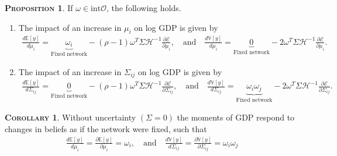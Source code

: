 \documentclass[11pt]{article}
\theoremstyle{definition}
\newtheorem{prop}{\noindent \textbf{\textsc{Proposition}}}
\newtheorem{cor}{\noindent \textbf{\textsc{Corollary}}}
\begin{document}
	\begin{prop}
		If $\omega\in\text{int}\mathcal{O}$, the following holds.
		\begin{enumerate}[leftmargin=1cm, label=\arabic*.]
			\item The impact of an increase in $\mu_i$ on log GDP is given by
			\begin{align*}
				\frac{d\mathbb{E}[y]}{d\mu_i} = \underbrace{\omega_i}\limits_{\text{Fixed network}} - (\rho-1)\omega^T\Sigma\mathcal{H}^{-1}\frac{\partial\mathcal{E}}{\partial\mu_i}, \quad \text{and}\quad \frac{d\mathbb{V}[y]}{d\mu_i} = \underbrace{0}\limits_{\text{Fixed network}} - 2\omega^T\Sigma\mathcal{H}^{-1}\frac{\partial\mathcal{E}}{\partial\mu_i}. 
			\end{align*}
			\item The impact of an increase in $\Sigma_{ij}$ on log GDP is given by
			\begin{align*}
				\frac{d\mathbb{E}[y]}{d\Sigma_{ij}} = \underbrace{0}\limits_{\text{Fixed network}} - (\rho-1)\omega^T\Sigma\mathcal{H}^{-1}\frac{\partial\mathcal{E}}{\partial\Sigma_{ij}}, \quad \text{and}\quad \frac{d\mathbb{V}[y]}{d\Sigma_{ij}} = \underbrace{\omega_i\omega_j}\limits_{\text{Fixed network}} - 2\omega^T\Sigma\mathcal{H}^{-1}\frac{\partial\mathcal{E}}{\partial\Sigma_{ij}}. 
			\end{align*}
		\end{enumerate}
	\end{prop}
	
	\begin{cor}
		Without uncertainty $(\Sigma = 0)$ the moments of GDP respond to changes in beliefs as if the network were fixed, such that
		\begin{align*}
			\frac{d\mathbb{E}[y]}{d\mu_i} = \frac{\partial\mathbb{E}[y]}{\partial\mu_i} = \omega_i, \quad \text{and} \quad \frac{d\mathbb{V}[y]}{d\Sigma_{ij}} = \frac{\partial\mathbb{V}[y]}{\partial\Sigma_{ij}} = \omega_i\omega_j
 		\end{align*}
	\end{cor}
	
\end{document}
